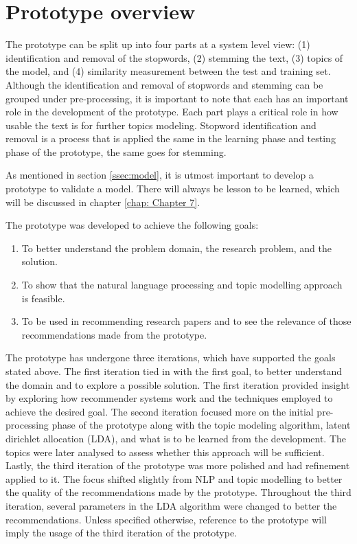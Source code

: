\section{Prototype overview}

The prototype can be split up into four parts at a system level view: (1) identification and removal of the stopwords, (2) stemming the text, (3) topics of the model, and (4) similarity measurement between the test and training set. Although the identification and removal of stopwords and stemming can be grouped under pre-processing, it is important to note that each has an important role in the development of the prototype. Each part plays a critical role in how usable the text is for further topics modeling. Stopword identification and removal is a process that is applied the same in the learning phase and testing phase of the prototype, the same goes for stemming.

As mentioned in section \ref{ssec:model}, it is utmost important to develop a prototype to validate a model. There will always be lesson to be learned, which will be discussed in chapter \ref{chap: Chapter 7}.

The prototype was developed to achieve the following goals:

\begin{enumerate}
    \item To better understand the problem domain, the research problem, and the solution.
    \item To show that the natural language processing and topic modelling approach is feasible.
    \item To be used in recommending research papers and to see the relevance of those recommendations made from the prototype.
\end{enumerate}

The prototype has undergone three iterations, which have supported the goals stated above. The first iteration tied in with the first goal, to better understand the domain and to explore a possible solution. The first iteration provided insight by exploring how recommender systems work and the techniques employed to achieve the desired goal. The second iteration focused more on the initial pre-processing phase of the prototype along with the topic modeling algorithm, latent dirichlet allocation (LDA), and what is to be learned from the development. The topics were later analysed to assess whether this approach will be sufficient. Lastly, the third iteration of the prototype was more polished and had refinement applied to it. The focus shifted slightly from NLP and topic modelling to better the quality of the recommendations made by the prototype. Throughout the third iteration, several parameters in the LDA algorithm were changed to better the recommendations. Unless specified otherwise, reference to the prototype will imply the usage of the third iteration of the prototype.

